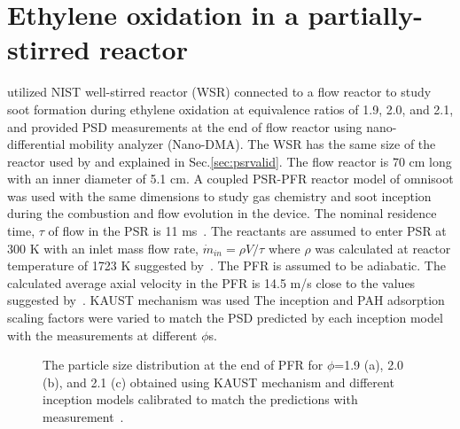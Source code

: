 \section{Ethylene oxidation in a partially-stirred reactor}

\citet{manzello2007soot} utilized NIST well-stirred reactor (WSR) connected to a flow reactor to study soot formation during ethylene oxidation at equivalence ratios of 1.9, 2.0, and 2.1, and provided PSD measurements at the end of flow reactor using nano-differential mobility analyzer (Nano-DMA). The WSR has the same size of the reactor used by \citet{manzello2007soot} and explained in Sec.\ref{sec:psrvalid}. The flow reactor is 70 cm long with an inner diameter of 5.1 cm. A coupled PSR-PFR reactor model of omnisoot was used with the same dimensions to study gas chemistry and soot inception during the combustion and flow evolution in the device. The nominal residence time, $\tau$ of flow in the PSR is 11 ms~\citet{manzello2007soot}. The reactants are assumed to enter PSR at 300 K with an inlet mass flow rate, $\dot{m}_{in}=\rho V / \tau$ where $\rho$ was calculated at reactor temperature of 1723 K suggested by~\citet{lenhert2009effects}. The PFR is assumed to be adiabatic. The calculated average axial velocity in the PFR is 14.5 m/s close to the values suggested by~\citet{manzello2007soot}. KAUST mechanism was used The inception and PAH adsorption scaling factors were varied to match the PSD predicted by each inception model with the measurements at different $\phi$s.

\begin{figure}[H]
	\centering
	\caption{The particle size distribution at the end of PFR for $\phi$=1.9 (a), 2.0 (b), and 2.1 (c) obtained using KAUST mechanism and different inception models calibrated to match the predictions with measurement~\citep{manzello2007soot}.}
	\label{fig:psrpfr_psd} 
\end{figure}


